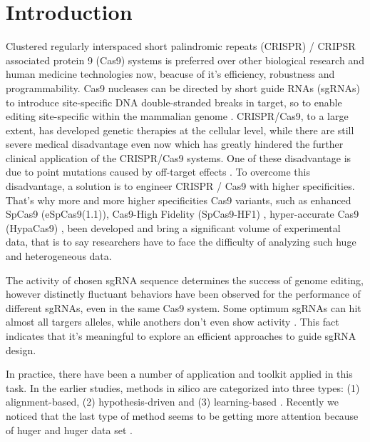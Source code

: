 \documentclass{bioinfo}
\begin{document}
\maketitle

\section{Introduction}

Clustered regularly interspaced short palindromic repeats (CRISPR) / CRIPSR associated protein 9 (Cas9) systems is preferred over other biological research and human medicine technologies now, beacuse of it's efficiency, 
 robustness and programmability.  Cas9 nucleases can be directed by short guide RNAs (sgRNAs) to introduce site-specific DNA double-stranded breaks in target, 
 so to enable editing site-specific within the mammalian genome \citep{jinek2012a,cong2013multiplex,mali2013rnaguided}. CRISPR/Cas9, to a large extent, has developed genetic therapies at the cellular level, 
 while there are still severe medical disadvantage even now which has greatly hindered the further clinical application of the CRISPR/Cas9 systems. 
 One of these disadvantage is due to point mutations caused by off-target effects \citep{rubeis2018risks,kang2016introducing,ishii2017reproductive,liang2015crispr/cas9-mediated}. 
 To overcome this disadvantage, a solution is to engineer CRISPR / Cas9 with higher specificities. 
 That's why more and more higher specificities Cas9 variants, such as enhanced SpCas9 (eSpCas9(1.1)), 
 Cas9-High Fidelity (SpCas9-HF1) \citep{ishii2017reproductive,slaymaker2016rationally}, hyper-accurate Cas9 (HypaCas9) \citep{kleinstiver2016high-fidelity}, 
 been developed and bring a significant volume of experimental data, that is to say researchers have to face the difficulty of analyzing such huge and heterogeneous data.

The activity of chosen sgRNA sequence determines the success of genome editing, however distinctly fluctuant behaviors have been observed for the performance of different sgRNAs, even in the same Cas9 system.
 Some optimum sgRNAs can hit almost all targers alleles, while anothers don't even show activity \citep{wang2019optimized}.
 This fact indicates that it's meaningful to explore an efficient approaches to guide sgRNA design. 


In practice, there have been a number of application and toolkit applied in this task. In the earlier studies, methods in silico are categorized into three types: 
 (1) alignment-based, (2) hypothesis-driven and (3) learning-based \citep{chuai2018deepcrispr}. 
 Recently we noticed that the last type of method seems to be getting more attention because of huger and huger data set \citep{liu2019computational}. 
\end{document}
